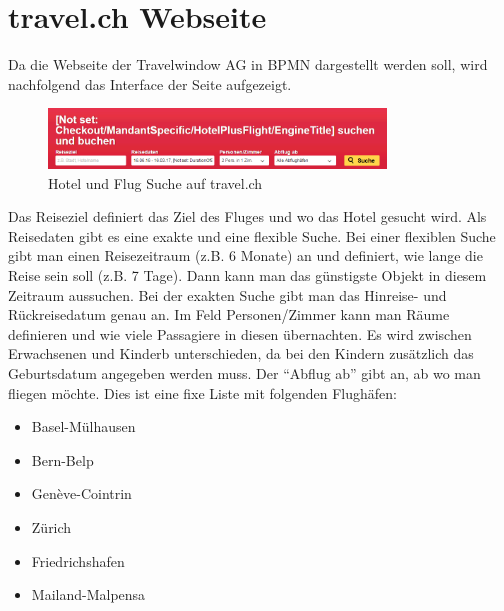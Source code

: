 \section{travel.ch Webseite}
\label{sec:recherche:travelch}
Da die Webseite der Travelwindow AG in BPMN dargestellt werden soll, wird nachfolgend das Interface der Seite aufgezeigt.
\begin{figure}[H]
	\centering
	\includegraphics[width=0.8\textwidth]{images/travel-search.png}
	\caption{Hotel und Flug Suche auf travel.ch}
	\label{fig:recherche:travelch:search}
\end{figure}
Das Reiseziel definiert das Ziel des Fluges und wo das Hotel gesucht wird. Als Reisedaten gibt es eine exakte und eine flexible Suche. Bei einer flexiblen Suche gibt man einen Reisezeitraum (z.B. 6 Monate) an und definiert, wie lange die Reise sein soll (z.B. 7 Tage). Dann kann man das günstigste Objekt in diesem Zeitraum aussuchen. Bei der exakten Suche gibt man das Hinreise- und Rückreisedatum genau an.
Im Feld Personen/Zimmer kann man Räume definieren und wie viele Passagiere in diesen übernachten. Es wird zwischen Erwachsenen und Kinderb unterschieden, da bei den Kindern zusätzlich das Geburtsdatum angegeben werden muss. Der "`Abflug ab"' gibt an, ab wo man fliegen möchte. Dies ist eine fixe Liste mit folgenden Flughäfen:
\begin{itemize}
\item Basel-Mülhausen
\item Bern-Belp
\item Genève-Cointrin
\item Zürich
\item Friedrichshafen
\item Mailand-Malpensa
\end{itemize}

